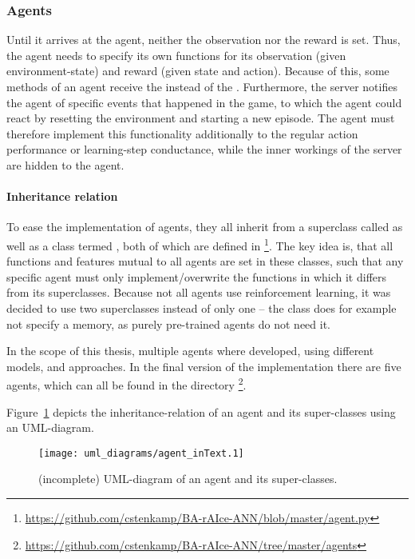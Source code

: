 \subsubsection{Agents}

Until it arrives at the agent, neither the observation nor the reward is set. Thus, the agent needs to specify its own functions for its observation (given environment-state) and reward (given state and action). Because of this, some methods of an agent receive the  instead of the . Furthermore, the server notifies the agent of specific events that happened in the game, to which the agent could react by resetting the environment and starting a new episode. The agent must therefore implement this functionality additionally to the regular action performance or learning-step conductance, while the inner workings of the server are hidden to the agent. 

\paragraph{Inheritance relation}

To ease the implementation of agents, they all inherit from a superclass called  as well as a class termed , both of which are defined in \footnote{\url{https://github.com/cstenkamp/BA-rAIce-ANN/blob/master/agent.py}}. The key idea is, that all functions and features mutual to all agents are set in these classes, such that any specific agent must only implement/overwrite the functions in which it differs from its superclasses. Because not all agents use reinforcement learning, it was decided to use two superclasses instead of only one -- the class  does for example not specify a memory, as purely pre-trained agents do not need it.

In the scope of this thesis, multiple agents where developed, using different models,  and approaches. In the final version of the implementation there are five agents, which can all be found in the directory \footnote{\url{https://github.com/cstenkamp/BA-rAIce-ANN/tree/master/agents}}. 

Figure~\ref{fig:agentMINI} depicts the inheritance-relation of an agent and its super-classes using an UML-diagram.
\begin{figure}[h!]
	\centering 
	\texttt{[image: uml\_diagrams/agent\_inText.1]}  
	\caption[UML-diagram of an agent and its super-classes]{(incomplete) UML-diagram of an agent and its super-classes.}
	\label{fig:agentMINI}
\end{figure}


